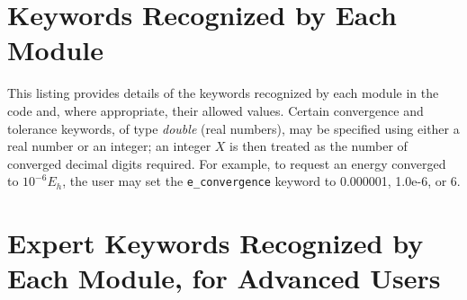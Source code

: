 \section{Keywords Recognized by Each Module}\label{keywords}
This listing provides details of the keywords recognized by each module in the
code and, where appropriate, their allowed values.  Certain convergence and tolerance
keywords, of type {\it double} (real numbers), may be specified using
either a real number or an integer; an integer $X$ is then treated as the
number of converged decimal digits required.  For example, to request an energy
converged to $10^{-6} E_h$, the user may set the {\tt e\_convergence} keyword
to 0.000001, 1.0e-6, or 6.

\section{Expert Keywords Recognized by Each Module, for Advanced Users}\label{expertkeywords}

